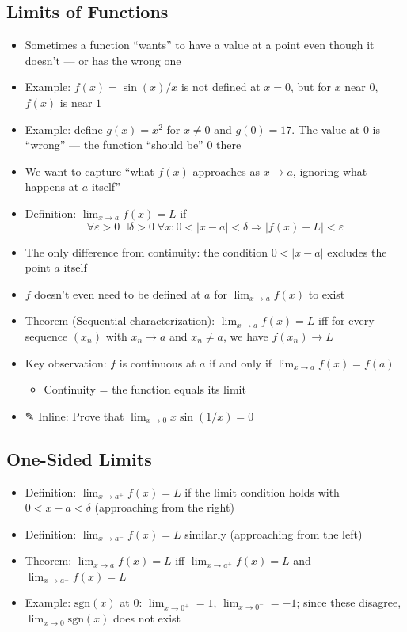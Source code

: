 \documentclass[
  10pt,
  letterpaper,
]{scrbook}
\providecommand{\tightlist}{%
  \setlength{\itemsep}{0pt}\setlength{\parskip}{0pt}}
\begin{document}
\subsection{Limits of Functions}\label{limits-of-functions}

\begin{itemize}
\tightlist
\item
  Sometimes a function ``wants'' to have a value at a point even though
  it doesn't --- or has the wrong one
\item
  Example: \(f(x) = \sin(x)/x\) is not defined at \(x = 0\), but for
  \(x\) near \(0\), \(f(x)\) is near \(1\)
\item
  Example: define \(g(x) = x^2\) for \(x \neq 0\) and \(g(0) = 17\). The
  value at \(0\) is ``wrong'' --- the function ``should be'' \(0\) there
\item
  We want to capture ``what \(f(x)\) approaches as \(x \to a\), ignoring
  what happens at \(a\) itself''
\item
  Definition: \(\lim_{x \to a} f(x) = L\) if
  \[\forall \varepsilon > 0 \; \exists \delta > 0 \; \forall x: 0 < |x - a| < \delta \Rightarrow |f(x) - L| < \varepsilon\]
\item
  The only difference from continuity: the condition \(0 < |x - a|\)
  excludes the point \(a\) itself
\item
  \(f\) doesn't even need to be defined at \(a\) for
  \(\lim_{x \to a} f(x)\) to exist
\item
  Theorem (Sequential characterization): \(\lim_{x \to a} f(x) = L\) iff
  for every sequence \((x_n)\) with \(x_n \to a\) and \(x_n \neq a\), we
  have \(f(x_n) \to L\)
\item
  Key observation: \(f\) is continuous at \(a\) if and only if
  \(\lim_{x \to a} f(x) = f(a)\)

  \begin{itemize}
  \tightlist
  \item
    Continuity = the function equals its limit
  \end{itemize}
\item
  ✎ Inline: Prove that \(\lim_{x \to 0} x \sin(1/x) = 0\)
\end{itemize}

\subsection{One-Sided Limits}\label{one-sided-limits}

\begin{itemize}
\tightlist
\item
  Definition: \(\lim_{x \to a^+} f(x) = L\) if the limit condition holds
  with \(0 < x - a < \delta\) (approaching from the right)
\item
  Definition: \(\lim_{x \to a^-} f(x) = L\) similarly (approaching from
  the left)
\item
  Theorem: \(\lim_{x \to a} f(x) = L\) iff \(\lim_{x \to a^+} f(x) = L\)
  and \(\lim_{x \to a^-} f(x) = L\)
\item
  Example: \(\text{sgn}(x)\) at \(0\): \(\lim_{x \to 0^+} = 1\),
  \(\lim_{x \to 0^-} = -1\); since these disagree,
  \(\lim_{x \to 0} \text{sgn}(x)\) does not exist
\end{itemize}
\end{document}
